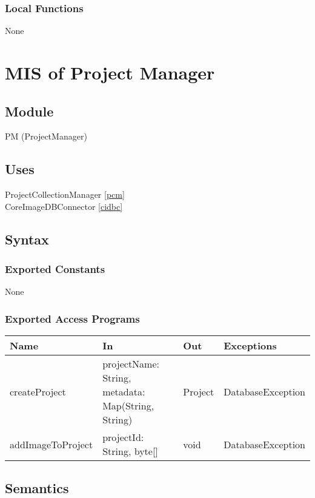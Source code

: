 \documentclass[12pt, titlepage]{article}
\begin{document}
\subsubsection{Local Functions}
None




\section{MIS of Project Manager} \label{pm} 
    \subsection{Module}
        PM (ProjectManager)

    \subsection{Uses}
        ProjectCollectionManager \ref{pcm}\\
        CoreImageDBConnector \ref{cidbc}

    \subsection{Syntax}
    \subsubsection{Exported Constants}
        None

    \subsubsection{Exported Access Programs}
    \begin{center}\begin{tabular}{p{3cm} p{4cm} p{3cm} p{3cm}}
    \hline\textbf{Name} & \textbf{In} & \textbf{Out} & \textbf{Exceptions} \\
    \hline
        createProject & projectName: String, metadata: Map(String, String) & Project & DatabaseException \\
        addImageToProject & projectId: String, byte[] & void & DatabaseException \\
    \hline
    \end{tabular}\end{center}

    \subsection{Semantics}
\end{document}
